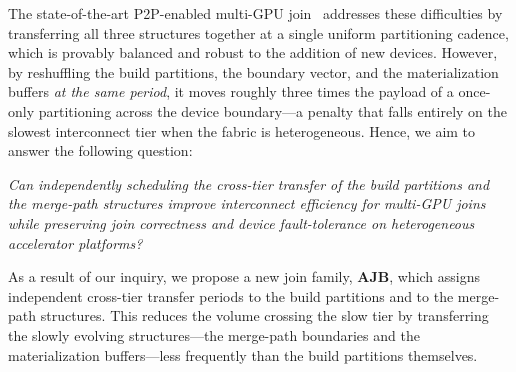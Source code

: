 \documentclass{article}
\begin{document}
The state-of-the-art P2P-enabled multi-GPU join~\citep{maltry2025multigpu}
addresses these difficulties by transferring all three structures together at a
single uniform partitioning cadence, which is provably balanced and robust to
the addition of new devices. However, by reshuffling the build partitions, the
boundary vector, and the materialization buffers \emph{at the same period}, it
moves roughly three times the payload of a once-only partitioning across the
device boundary---a penalty that falls entirely on the slowest interconnect tier
when the fabric is heterogeneous. Hence, we aim to answer the following question:

\begin{center}
\emph{Can independently scheduling the cross-tier transfer of the build
partitions and the merge-path structures improve interconnect efficiency for
multi-GPU joins while preserving join correctness and device fault-tolerance
on heterogeneous accelerator platforms?}
\end{center}

As a result of our inquiry, we propose a new join family, \textbf{AJB}, which
assigns independent cross-tier transfer periods to the build partitions and to
the merge-path structures. This reduces the volume crossing the slow tier by
transferring the slowly evolving structures---the merge-path boundaries and the
materialization buffers---less frequently than the build partitions themselves.

\end{document}
